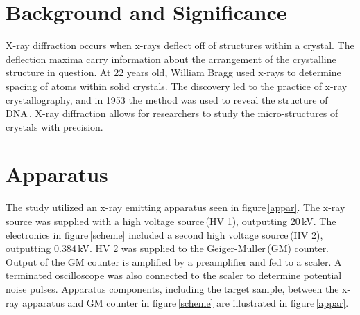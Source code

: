 \documentclass[aps,prl,twocolumn,superscriptaddress,nofootinbib]{revtex4-1}
\begin{document}
\maketitle    %


\section{Background and Significance}
X-ray diffraction occurs when x-rays deflect off of structures within a crystal. The deflection maxima carry information about the arrangement of the crystalline structure in question. At 22 years old, William Bragg used x-rays to determine spacing of atoms within solid crystals. The discovery led to the practice of x-ray crystallography, and in 1953 the method was used to reveal the structure of DNA\,\cite{2}. X-ray diffraction allows for researchers to study the micro-structures of crystals with precision.



\section{Apparatus}


The study utilized an x-ray emitting apparatus seen in figure\,\ref{appar}. The x-ray source was supplied with a high voltage source\,(HV 1), outputting 20\,kV. The electronics in figure\,\ref{scheme} included a second high voltage source\,(HV 2), outputting 0.384\,kV. HV 2 was supplied to the Geiger-Muller\,(GM) counter. Output of the GM counter is amplified by a preamplifier and fed to a scaler. A terminated oscilloscope was also connected to the scaler to determine potential noise pulses. Apparatus components, including the target sample, between the x-ray apparatus and GM counter in figure\,\ref{scheme} are illustrated in figure\,\ref{appar}.
\end{document}
